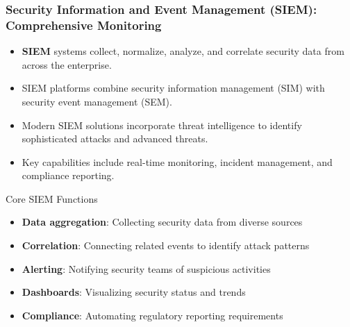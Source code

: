 \documentclass{beamer}
\begin{document}
\begin{frame}
\frametitle{Security Information and Event Management (SIEM): Comprehensive Monitoring}
\begin{itemize}
\item \textbf{SIEM} systems collect, normalize, analyze, and correlate security data from across the enterprise.
\item SIEM platforms combine security information management (SIM) with security event management (SEM).
\item Modern SIEM solutions incorporate threat intelligence to identify sophisticated attacks and advanced threats.
\item Key capabilities include real-time monitoring, incident management, and compliance reporting.
\end{itemize}

\begin{block}{Core SIEM Functions}
    \scriptsize
\begin{itemize}
\item \textbf{Data aggregation}: Collecting security data from diverse sources
\item \textbf{Correlation}: Connecting related events to identify attack patterns
\item \textbf{Alerting}: Notifying security teams of suspicious activities
\item \textbf{Dashboards}: Visualizing security status and trends
\item \textbf{Compliance}: Automating regulatory reporting requirements
\end{itemize}
\end{block}
\end{frame}
\end{document}
